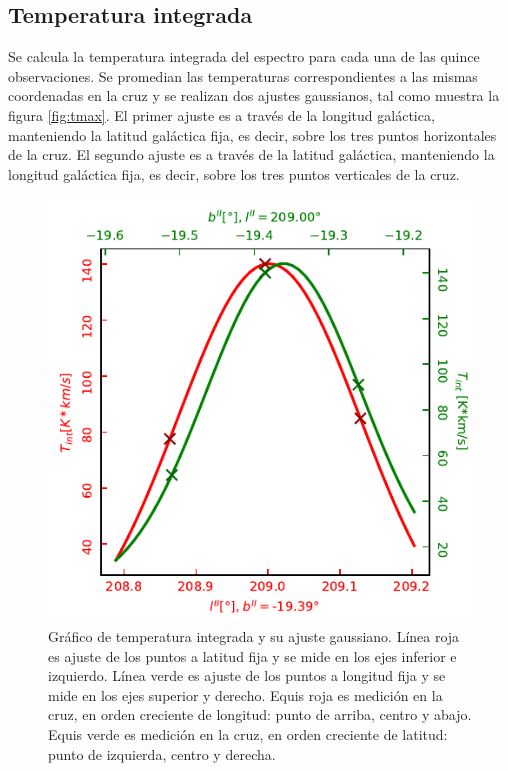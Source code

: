 \subsection{Temperatura integrada}

Se calcula la temperatura integrada del espectro para cada una de las quince observaciones. Se promedian las temperaturas correspondientes a las mismas coordenadas en la cruz y se realizan dos ajustes gaussianos, tal como muestra la figura \ref{fig:tmax}. El primer ajuste es a través de la longitud galáctica, manteniendo la latitud galáctica fija, es decir, sobre los tres puntos horizontales de la cruz. El segundo ajuste es a través de la latitud galáctica, manteniendo la longitud galáctica fija, es decir, sobre los tres puntos verticales de la cruz.

\begin{figure}[htbp]
	\centering
	\includegraphics{tint.pdf}
	\caption{Gráfico de temperatura integrada y su ajuste gaussiano. Línea roja es ajuste de los puntos a latitud fija y se mide en los ejes inferior e izquierdo. Línea verde es ajuste de los puntos a longitud fija y se mide en los ejes superior y derecho. Equis roja es medición en la cruz, en orden creciente de longitud: punto de arriba, centro y abajo. Equis verde es medición en la cruz, en orden creciente de latitud: punto de izquierda, centro y derecha.}
	\label{fig:tint}
\end{figure}

